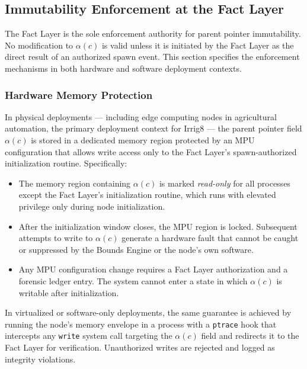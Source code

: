 \subsection{Immutability Enforcement at the Fact Layer}
\label{sec:immutability-enforcement}

The Fact Layer is the sole enforcement authority for parent pointer immutability. No modification to $\alpha(c)$ is valid unless it is initiated by the Fact Layer as the direct result of an authorized spawn event. This section specifies the enforcement mechanisms in both hardware and software deployment contexts.

\subsubsection{Hardware Memory Protection}
\label{sec:hardware-mpu}

In physical deployments — including edge computing nodes in agricultural automation, the primary deployment context for Irrig8 — the parent pointer field $\alpha(c)$ is stored in a dedicated memory region protected by an MPU configuration that allows write access only to the Fact Layer's spawn-authorized initialization routine. Specifically:

\begin{itemize}
    \item The memory region containing $\alpha(c)$ is marked \textit{read-only} for all processes except the Fact Layer's initialization routine, which runs with elevated privilege only during node initialization.

    \item After the initialization window closes, the MPU region is locked. Subsequent attempts to write to $\alpha(c)$ generate a hardware fault that cannot be caught or suppressed by the Bounds Engine or the node's own software.

    \item Any MPU configuration change requires a Fact Layer authorization and a forensic ledger entry. The system cannot enter a state in which $\alpha(c)$ is writable after initialization.
\end{itemize}

In virtualized or software-only deployments, the same guarantee is achieved by running the node's memory envelope in a process with a \texttt{ptrace} hook that intercepts any \texttt{write} system call targeting the $\alpha(c)$ field and redirects it to the Fact Layer for verification. Unauthorized writes are rejected and logged as integrity violations.


